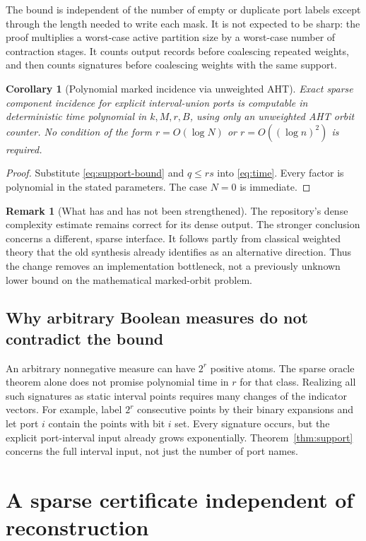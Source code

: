 \documentclass[11pt,letterpaper]{article}
\newtheorem{corollary}[theorem]{Corollary}
\theoremstyle{definition}
\newtheorem{remark}[theorem]{Remark}
\begin{document}
The bound is independent of the number of empty or duplicate port labels
except through the length needed to write each mask. It is not expected to
be sharp: the proof multiplies a worst-case active partition size by a
worst-case number of contraction stages. It counts output records before
coalescing repeated weights, and then counts signatures before coalescing
weights with the same support.

\begin{corollary}[Polynomial marked incidence via unweighted AHT]\label{cor:poly}
Exact sparse component incidence for explicit interval-union ports is
computable in deterministic time polynomial in $k,M,r,B$, using only an
unweighted AHT orbit counter. No condition of the form
$r=O(\log N)$ or $r=O((\log n)^2)$ is required.
\end{corollary}
\begin{proof}
Substitute \eqref{eq:support-bound} and $q\le rs$ into
\eqref{eq:time}. Every factor is polynomial in the stated parameters.
The case $N=0$ is immediate.
\end{proof}

\begin{remark}[What has and has not been strengthened]
The repository's dense complexity estimate remains correct for its dense
output. The stronger conclusion concerns a different, sparse interface.
It follows partly from classical weighted theory that the old synthesis
already identifies as an alternative direction. Thus the change removes
an implementation bottleneck, not a previously unknown lower bound on the
mathematical marked-orbit problem.
\end{remark}

\subsection{Why arbitrary Boolean measures do not contradict the bound}
An arbitrary nonnegative measure can have $2^r$ positive atoms. The sparse
oracle theorem alone does not promise polynomial time in $r$ for that
class. Realizing all such signatures as static interval points requires
many changes of the indicator vectors. For example, label $2^r$ consecutive
points by their binary expansions and let port $i$ contain the points with
bit $i$ set. Every signature occurs, but the explicit port-interval input
already grows exponentially. Theorem~\ref{thm:support} concerns the full
interval input, not just the number of port names.

\section{A sparse certificate independent of reconstruction}\label{sec:certificate}
\end{document}
